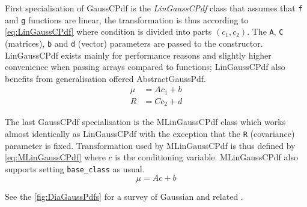First specialisation of GaussCPdf is the \emph{LinGaussCPdf} class that assumes that \verb|f| and
\verb|g| functions are linear, the transformation is thus according to \eqref{eq:LinGaussCPdf} where
condition is divided into parts \((c_1, c_2)\). The \verb|A|, \verb|C| (matrices), \verb|b| and
\verb|d| (vector) parameters are passed to the constructor. LinGaussCPdf exists mainly for
performance reasons and slightly higher convenience when passing arrays compared to functions;
LinGaussCPdf also benefits from generalisation offered AbstractGaussPdf.
\begin{equation} \label{eq:LinGaussCPdf}
	\begin{aligned}
		\mu &= A c_1 + b \\
		R &= C c_2 + d
	\end{aligned}
\end{equation}

The last GaussCPdf specialisation is the MLinGaussCPdf class which works almost identically as
LinGaussCPdf with the exception that the \verb|R| (covariance) parameter is fixed. Transformation
used by MLinGaussCPdf is thus defined by \eqref{eq:MLinGaussCPdf} where \(c\) is the conditioning
variable. MLinGaussCPdf also supports setting \verb|base_class| as usual.
\begin{equation} \label{eq:MLinGaussCPdf}
	\mu = A c + b
\end{equation}

See the \autoref{fig:DiaGaussPdfs} for a survey of Gaussian and related {\pdfs}.

